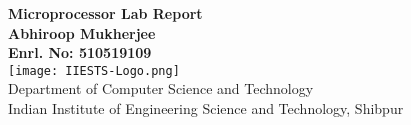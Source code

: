 

\begin{titlepage}
    \begin{center}
        \vspace*{1cm}
 
        \huge
            \textbf{Microprocessor Lab Report}\\
        \vspace{1cm}
        \large
            \textbf{Abhiroop Mukherjee}\\
            \textbf{Enrl. No: 510519109}\\
        \vspace{1cm}
        \texttt{[image: IIESTS-Logo.png]}\\
        \vspace{1cm}
        \normalsize
        Department of Computer Science and Technology\\
        Indian Institute of Engineering Science and Technology, Shibpur 
 
        \vfill               
    \end{center}
 \end{titlepage}